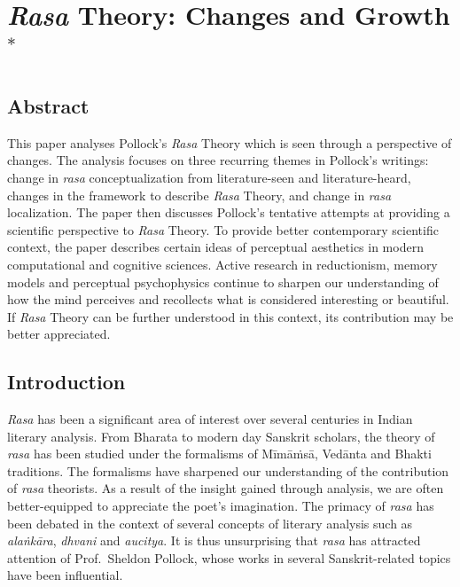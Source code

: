 \chapter[\textsl{Rasa} Theory: Changes and Growth]{\textsl{Rasa} Theory: Changes and Growth$^{*}$}\label{chapter\thechapter:begin}

\section*{Abstract}

This paper analyses Pollock’s \textsl{Rasa} Theory which is seen through a perspective of changes. The analysis focuses on three recurring themes in Pollock's writings: change in \textsl{rasa} conceptualization from literature-seen and literature-heard, changes in the framework to describe \textsl{Rasa} Theory, and change in \textsl{rasa} localization. The paper then discusses Pollock’s tentative attempts at providing a scientific perspective to \textsl{Rasa} Theory. To provide better contemporary scientific context, the paper describes certain ideas of perceptual aesthetics in modern computational and cognitive sciences. Active research in reductionism, memory models and perceptual psychophysics continue to sharpen our understanding of how the mind perceives and recollects what is considered interesting or beautiful. If \textsl{Rasa} Theory can be further understood in this context, its contribution may be better appreciated. 

\section*{Introduction}

\textsl{Rasa} has been a significant area of interest over several centuries in Indian literary analysis. From Bharata to modern day Sanskrit scholars, the theory of \textsl{rasa} has been studied under the formalisms of Mīmāṁsā, Vedānta and Bhakti traditions. The formalisms have sharpened our understanding of the contribution of \textsl{rasa} theorists. As a result of the insight gained through analysis, we are often better-equipped to appreciate the poet’s imagination. The primacy of \textsl{rasa} has been debated in the context of several concepts of literary analysis such as \textsl{alaṅkāra}, \textsl{dhvani} and \textsl{aucitya}. It is thus unsurprising that \textsl{rasa} has attracted attention of Prof.\ Sheldon Pollock, whose works in several Sanskrit-related topics have been influential. 

